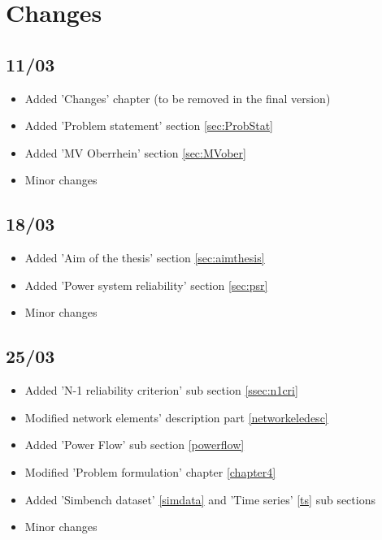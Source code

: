\chapter{Changes}

\section{11/03}
\begin{itemize}
    \item Added 'Changes' chapter (to be removed in the final version)
    \item Added 'Problem statement' section \ref{sec:ProbStat}
    \item Added 'MV Oberrhein' section \ref{sec:MVober}
    \item Minor changes
\end{itemize}

\section{18/03}
\begin{itemize}
    \item Added 'Aim of the thesis' section \ref{sec:aimthesis}
    \item Added 'Power system reliability' section \ref{sec:psr}
    \item Minor changes
\end{itemize}

\section{25/03}
\begin{itemize}
    \item Added 'N-1 reliability criterion' sub section \ref{ssec:n1cri}
    \item Modified network elements' description part \ref{networkeledesc}
    \item Added 'Power Flow' sub section \ref{powerflow}
    \item Modified 'Problem formulation' chapter \ref{chapter4}
    \item Added 'Simbench dataset' \ref{simdata} and 'Time series' \ref{ts} sub sections
    \item Minor changes
\end{itemize}



